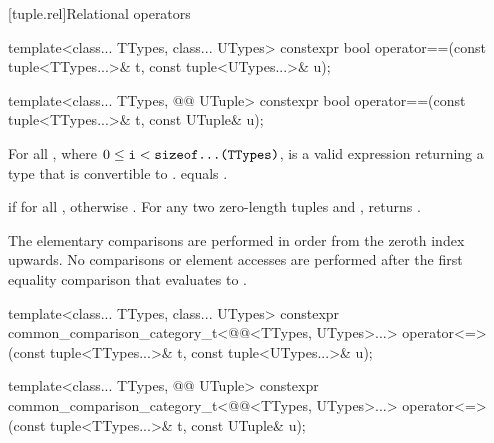 \documentclass{wg21}
\begin{document}
[tuple.rel]{Relational operators}

%
\begin{itemdecl}
template<class... TTypes, class... UTypes>
constexpr bool operator==(const tuple<TTypes...>& t, const tuple<UTypes...>& u);
\end{itemdecl}
\begin{addedblock}
\begin{itemdecl}
template<class... TTypes, @@ UTuple>
constexpr bool operator==(const tuple<TTypes...>& t, const UTuple& u);
\end{itemdecl}
\end{addedblock}

\begin{itemdescr}
    \pnum
    \mandates
    For all ,
    where $0 \leq \texttt{i} < \texttt{sizeof...(TTypes)}$,
     is a valid expression
    returning a type that is convertible to .
     equals
    .
    
    \pnum
    \returns
     if  for all
    , otherwise .
    For any two zero-length tuples  and ,  returns .
    
    \pnum
    \remarks
    The elementary comparisons are performed in order from the
    zeroth index upwards.  No comparisons or element accesses are
    performed after the first equality comparison that evaluates to
    .
\end{itemdescr}

%
\begin{itemdecl}
template<class... TTypes, class... UTypes>
constexpr common_comparison_category_t<@@<TTypes, UTypes>...>
operator<=>(const tuple<TTypes...>& t, const tuple<UTypes...>& u);
\end{itemdecl}
\begin{addedblock}
\begin{itemdecl}
template<class... TTypes, @@ UTuple>
constexpr common_comparison_category_t<@@<TTypes, UTypes>...>
operator<=>(const tuple<TTypes...>& t, const UTuple& u);
\end{itemdecl}
\end{addedblock}
\end{document}
